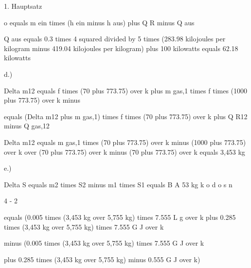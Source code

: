 1. Hauptsatz

o equals m ein times (h ein minus h aus) plus Q R minus Q aus

Q aus equals 0.3 times 4 squared divided by 5 times (283.98 kilojoules per kilogram minus 419.04 kilojoules per kilogram) plus 100 kilowatts equals 62.18 kilowatts

d.)

Delta m12 equals f times (70 plus 773.75) over k plus m gas,1 times f times (1000 plus 773.75) over k minus

equals (Delta m12 plus m gas,1) times f times (70 plus 773.75) over k plus Q R12 minus Q gas,12

Delta m12 equals m gas,1 times (70 plus 773.75) over k minus (1000 plus 773.75) over k over (70 plus 773.75) over k minus (70 plus 773.75) over k equals 3,453 kg

e.)

Delta S equals m2 times S2 minus m1 times S1 equals B A 53 kg k o d o s n

4 - 2

equals (0.005 times (3,453 kg over 5,755 kg) times 7.555 L g over k plus 0.285 times (3,453 kg over 5,755 kg) times 7.555 G J over k

minus (0.005 times (3,453 kg over 5,755 kg) times 7.555 G J over k

plus 0.285 times (3,453 kg over 5,755 kg) minus 0.555 G J over k)